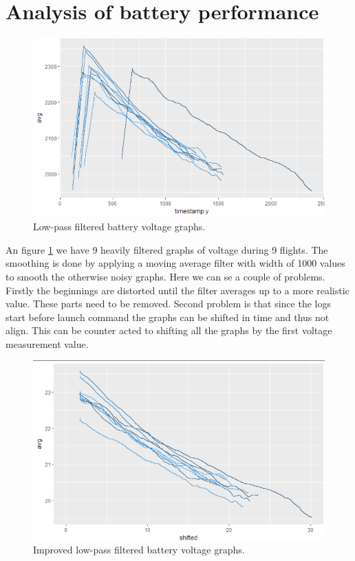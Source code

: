 \documentclass[12pt,oneside]{reedthesis}
\theoremstyle{definition}
\theoremstyle{definition}
\theoremstyle{definition}
\theoremstyle{remark}
\begin{document}
\hypertarget{analysis-of-battery-performance}{\section{Analysis of
battery performance}\label{analysis-of-battery-performance}}
\begin{figure}
\centering
\includegraphics{./figure/akuGraafikutPekkis.PNG}
\caption{\label{fig:pekk}Low-pass filtered battery voltage graphs.}
\end{figure}
An figure \ref{fig:pekk} we have 9 heavily filtered graphs of voltage
during 9 flights. The smoothing is done by applying a moving average
filter with width of 1000 values to smooth the otherwise noisy graphs.
Here we can se a couple of problems. Firstly the beginnings are
distorted until the filter averages up to a more realistic value. These
parts need to be removed. Second problem is that since the logs start
before launch command the graphs can be shifted in time and thus not
align. This can be counter acted to shifting all the graphs by the first
voltage measurement value.
\begin{figure}
\centering
\includegraphics{./figure/akuGraafikudFixed.PNG}
\caption{\label{fig:fixed}Improved low-pass filtered battery voltage
graphs.}
\end{figure}
\end{document}
